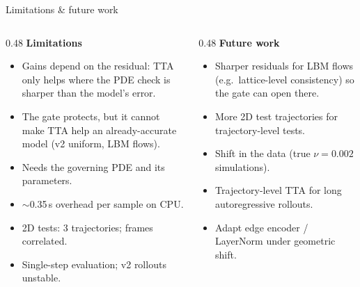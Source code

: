 \documentclass[aspectratio=169,11pt]{beamer}
\begin{document}
\begin{frame}{Limitations \& future work}
\begin{columns}[T]
\begin{column}{0.48\textwidth}
\textbf{Limitations}
\begin{itemize}\small\setlength{\itemsep}{2pt}
\item Gains depend on the residual: TTA only helps where the PDE check is sharper than the model's error.
\item The gate protects, but it cannot make TTA help an already-accurate model (v2 uniform, LBM flows).
\item Needs the governing PDE and its parameters.
\item $\sim$0.35\,s overhead per sample on CPU.
\item 2D tests: 3 trajectories; frames correlated.
\item Single-step evaluation; v2 rollouts unstable.
\end{itemize}
\end{column}
\begin{column}{0.48\textwidth}
\textbf{Future work}
\begin{itemize}\small\setlength{\itemsep}{2pt}
\item Sharper residuals for LBM flows (e.g.\ lattice-level consistency) so the gate can open there.
\item More 2D test trajectories for trajectory-level tests.
\item Shift in the data (true $\nu=0.002$ simulations).
\item Trajectory-level TTA for long autoregressive rollouts.
\item Adapt edge encoder / LayerNorm under geometric shift.
\end{itemize}
\end{column}
\end{columns}
\end{frame}
\end{document}
